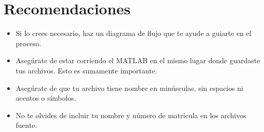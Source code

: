\documentclass[]{book}
\theoremstyle{definition}
\begin{document}
\section*{Recomendaciones}
\begin{itemize}
    \item Si lo crees necesario, haz un diagrama de flujo que te ayude a guiarte en el proceso.
    \item Asegúrate de estar corriendo el MATLAB en el mismo lugar donde guardaste tus archivos. Esto es sumamente importante.
    \item Asegúrate de que tu archivo tiene nombre en minúsculas, sin espacios ni acentos o símbolos. 
    \item No te olvides de incluir tu nombre y número de matrícula en los archivos fuente.
\end{itemize}
\end{document}
